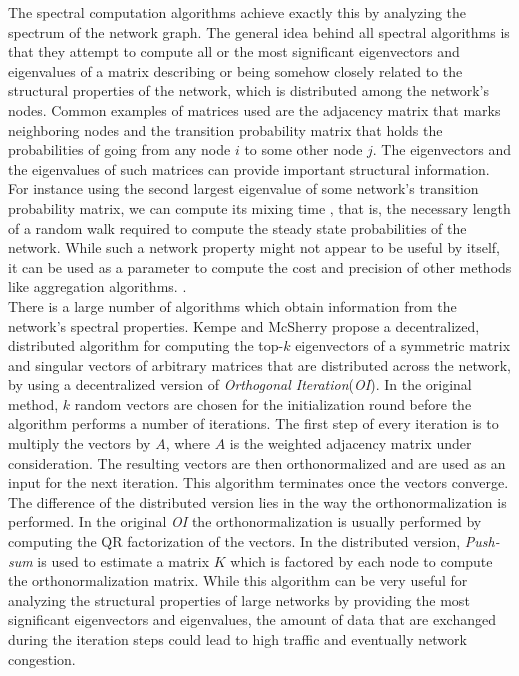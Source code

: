 \documentclass[a4paper,11pt,twoside]{report}
\begin{document}
The spectral computation algorithms achieve exactly this by analyzing the spectrum of the network graph. The general idea behind all spectral algorithms is that they attempt to compute all or the most significant eigenvectors and eigenvalues of a matrix describing or being somehow closely related to the structural properties of the network, which is distributed among the network's nodes. Common examples of matrices used are the adjacency matrix that marks neighboring nodes and the transition probability matrix that holds the probabilities of going from any node $i$ to some other node $j$. The eigenvectors and the eigenvalues of such matrices can provide important structural information. For instance using the second largest eigenvalue of some network's transition probability matrix, we can compute its mixing time \cite{Snader:2009:ESP:1855663.1855672} \cite{Datta:2007:UDS:1270387.1270884}, that is, the necessary length of a random walk required to compute the steady state probabilities of the network. While such a network property might not appear to be useful by itself, it can be used as a parameter to compute the cost and precision of other methods like aggregation algorithms. \cite{Kempe:2003:GCA:946243.946317} \cite{Sauerwald:2007:MEE:1781574.1781600}.\\
 
 
There is a large number of algorithms which obtain information from the network's spectral properties. Kempe and McSherry \cite{Kempe:2004:DAS:1007352.1007438} propose a decentralized, distributed algorithm for computing the top-$k$ eigenvectors of a symmetric matrix and singular vectors of arbitrary matrices that are distributed across the network, by using a decentralized version of \textit{Orthogonal Iteration}(\textit{OI}). In the original method, $k$ random vectors are chosen for the initialization round before the algorithm performs a number of iterations. The first step of every iteration is to multiply the vectors by $A$, where $A$ is the weighted adjacency matrix under consideration. The resulting vectors are then orthonormalized and are used as an input for the next iteration. This algorithm terminates once the vectors converge. The difference of the distributed version lies in the way the orthonormalization is performed. In the original \textit{OI} the orthonormalization is usually performed by computing the QR factorization of the vectors. In the distributed version, \textit{Push-sum} is used to estimate a matrix $K$ which is factored by each node to compute the orthonormalization matrix. While this algorithm can be very useful for analyzing the structural properties of large networks by providing the most significant eigenvectors and eigenvalues, the amount of data that are exchanged during the iteration steps could lead to high traffic and eventually network congestion.\\
\end{document}
